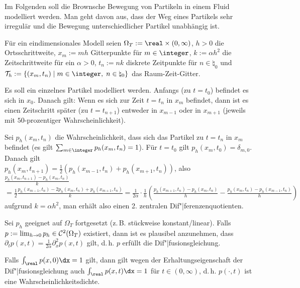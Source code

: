 \begin{Bsp}
    Im Folgenden soll die Brownsche Bewegung von Partikeln in einem Fluid modelliert werden.
    Man geht davon aus, dass der Weg eines Partikels sehr irregulär und die Bewegung
    unterschiedlicher Partikel unabhängig ist.
    
    Für ein eindimensionales Modell seien $\Omega_T := \real \times (0, \infty)$,
    $h > 0$ die Ortsschrittweite,
    $x_m := mh$ Gitterpunkte für $m \in \integer$,
    $k := \alpha h^2$ die Zeitschrittweite für ein $\alpha > 0$,
    $t_n := nk$ diskrete Zeitpunkte für $n \in \natural_0$ und
    $\T_h := \{(x_m, t_n) \;|\; m \in \integer,\; n \in \natural_0\}$ das Raum-Zeit-Gitter.
    
    Es soll ein einzelnes Partikel modelliert werden.
    Anfangs (zu $t = t_0$) befindet es sich in $x_0$.
    Danach gilt:
    Wenn es sich zur Zeit $t = t_n$ in $x_m$ befindet, dann ist es einen Zeitschritt später
    (zu $t = t_{n+1}$) entweder in $x_{m-1}$ oder in $x_{m+1}$
    (jeweils mit $50$-prozentiger Wahrscheinlichkeit).
    
    Sei $p_h(x_m, t_n)$ die Wahrscheinlichkeit, dass sich das Partikel zu $t = t_n$ in $x_m$
    befindet (es gilt $\sum_{m \in \integer} p_h(x_m, t_n) = 1$).
    Für $t = t_0$ gilt $p_h(x_m, t_0) = \delta_{m,0}$.
    Danach gilt\\
    $p_h(x_m, t_{n+1}) = \frac{1}{2} (p_h(x_{m-1}, t_n) + p_h(x_{m+1}, t_n))$, also
    $\frac{p_h(x_m, t_{n+1}) - p_h(x_m, t_n)}{k}$\\
    $= \frac{1}{2} \frac{p_h(x_{m-1}, t_n) - 2p_h(x_m, t_n) + p_h(x_{m+1}, t_n)}{k}
    = \frac{1}{2\alpha} \cdot \frac{1}{h}
    \left(\frac{p_h(x_{m+1}, t_n) - p_h(x_m, t_n)}{h} -
    \frac{p_h(x_m, t_n) - p_h(x_{m-1}, t_n)}{h}\right)$
    aufgrund $k = \alpha h^2$,
    man erhält also einen 2. zentralen Dif"|ferenzenquotienten.
    
    Sei $p_h$ geeignet auf $\Omega_T$ fortgesetzt
    (z.\,B. stückweise konstant/linear).
    Falls\\
    $p := \lim_{h \to 0} p_h \in \mathcal{C}^2(\Omega_T)$ existiert, dann ist es plausibel
    anzunehmen, dass $\partial_t p(x, t) = \frac{1}{2\alpha} \partial_x^2 p(x, t)$ gilt,
    d.\,h. $p$ erfüllt die Dif"|fusionsgleichung.
    
    Falls $\int_\real p(x, 0)\dx = 1$ gilt, dann gilt wegen der Erhaltungseigenschaft der
    Dif"|fusionsgleichung auch $\int_\real p(x, t)\dx = 1$ für $t \in (0, \infty)$, d.\,h.
    $p(\cdot, t)$ ist eine Wahrscheinlichkeitsdichte.
\end{Bsp}

\pagebreak
